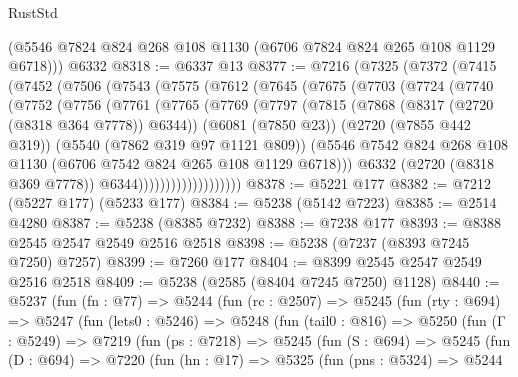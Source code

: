 \begin{lexlean}{RustStd}
\begin{coremodule}
      (@5546 @7824 @824 @268 @108 @1130 (@6706 @7824 @824 @265 @108 @1129 @6718)))
    @6332
@8318 := @6337 @13
@8377 := @7216
    (@7325
      (@7372
        (@7415
          (@7452
            (@7506
              (@7543
                (@7575
                  (@7612
                    (@7645
                      (@7675
                        (@7703
                          (@7724
                            (@7740
                              (@7752
                                (@7756
                                  (@7761
                                    (@7765
                                      (@7769
                                        (@7797
                                          (@7815
                                            (@7868 (@8317 (@2720 (@8318 @364 @7778)) @6344))
                                            (@6081 (@7850 @23))
                                            (@2720 (@7855 @442 @319))
                                            (@5540 (@7862 @319 @97 @1121 @809))
                                            (@5546
                                              @7542
                                              @824
                                              @268
                                              @108
                                              @1130
                                              (@6706 @7542 @824 @265 @108 @1129 @6718)))
                                          @6332
                                          (@2720 (@8318 @369 @7778))
                                          @6344)))))))))))))))))))
@8378 := @5221 @177
@8382 := @7212 (@5227 @177) (@5233 @177)
@8384 := @5238 (@5142 @7223)
@8385 := @2514 @4280
@8387 := @5238 (@8385 @7232)
@8388 := @7238 @177
@8393 := @8388 @2545 @2547 @2549 @2516 @2518
@8398 := @5238 (@7237 (@8393 @7245 @7250) @7257)
@8399 := @7260 @177
@8404 := @8399 @2545 @2547 @2549 @2516 @2518
@8409 := @5238 (@2585 (@8404 @7245 @7250) @1128)
@8440 := @5237
    (fun (fn : @77) =>
    @5244
      (fun (rc : @2507) =>
      @5245
        (fun (rty : @694) =>
        @5247
          (fun (lets0 : @5246) =>
          @5248
            (fun (tail0 : @816) =>
            @5250
              (fun (Γ : @5249) =>
              @7219
                (fun (ps : @7218) =>
                @5245
                  (fun (S : @694) =>
                  @5245
                    (fun (D : @694) =>
                    @7220
                      (fun (hn : @17) =>
                      @5325
                        (fun (pns : @5324) =>
                        @5244

\end{coremodule}
\end{lexlean}
